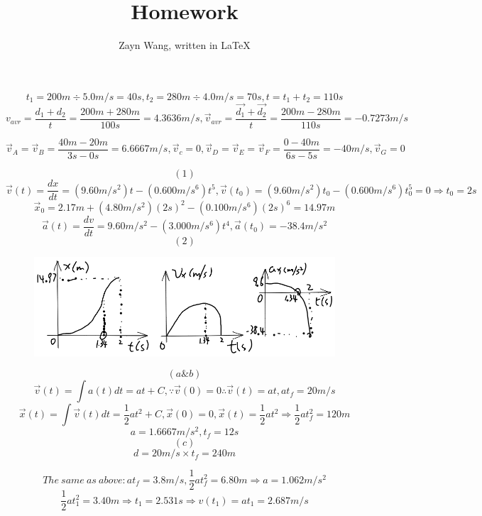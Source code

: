 \documentclass{homework}
\author{Zayn Wang, written in \LaTeX}
\title{Homework}
\begin{document}
 \maketitle

\newcommand\degree{^\circ}

\newcommand\rarr{\rightarrow}

\newcommand\rArr{\Rightarrow}



\question
$$ t_1 = 200m \div 5.0m/s = 40s, t_2 = 280m \div 4.0m/s = 70s, t = t_1 + t_2 = 110s
$$
$$ v_{avr} = \frac{d_1 + d_2}{t} = \frac{200m + 280m}{100s} = 4.3636m/s, \vec{v}_{avr} = \frac{\vec{d_1} + \vec{d_2}}{t} = \frac{200m - 280m}{110s} = -0.7273m/s
$$

\question

$$ \vec{v}_A = \vec{v}_B = \frac{40m - 20m}{3s - 0s} = 6.6667m/s, \vec{v}_c = 0, \vec{v}_D = \vec{v}_E = \vec{v}_F = \frac{0 - 40m}{6s - 5s} = -40m/s, \vec{v}_G = 0
$$

\question

$$(1)
$$
$$ \vec{v}(t) = \frac{dx}{dt} = (9.60m/s^2)t - (0.600m/s^6)t^5, \vec{v}(t_0) = (9.60m/s^2)t_0 - (0.600m/s^6)t_0^5 = 0 \rArr t_0 = 2s
$$
$$ \vec{x}_0 = 2.17m + (4.80m/s^2)(2s)^2 - (0.100m/s^6)(2s)^6 = 14.97m
$$
$$ \vec{a}(t) = \frac{dv}{dt} = 9.60m/s^2 - (3.000m/s^6)t^4, \vec{a}(t_0) = -38.4m/s^2
$$
$$(2)
$$
\begin{figure}[ht!]
    \includegraphics[width=12cm]{homework.png}
\end{figure}

\question

$$(a\&b)
$$
$$ \vec{v}(t) = \int{a(t)}dt = at + C, \because \vec{v}(0) = 0 \therefore \vec{v}(t) = at, at_f = 20m/s
$$
$$ \vec{x}(t) = \int{\vec{v}(t)}dt = \frac{1}{2}at^2 + C, \vec{x}(0) = 0, \vec{x}(t) = \frac{1}{2}at^2 \rArr \frac{1}{2}at_f^2 = 120m
$$
$$ a = 1.6667m/s^2, t_f = 12s
$$
$$(c)
$$
$$ d = 20m/s \times t_f = 240m
$$

\question

$$ The \ same \ as \ above: at_f = 3.8m/s, \frac{1}{2}at_f^2 = 6.80m \rArr a = 1.062m/s^2
$$
$$ \frac{1}{2}at_1^2 = 3.40m \rArr t_1 = 2.531s \rArr v(t_1) = at_1 = 2.687m/s
$$
\end{document}
